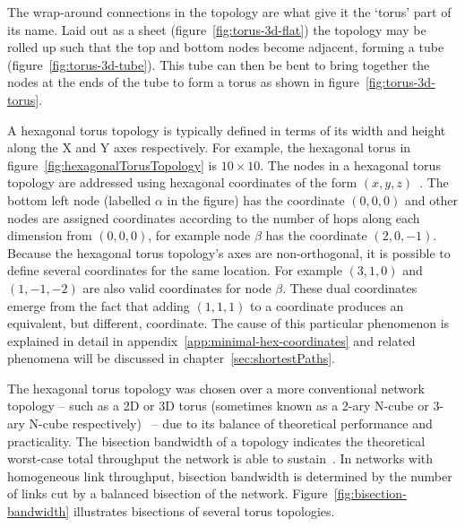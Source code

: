 		The wrap-around connections in the topology are what give it the `torus'
		part of its name. Laid out as a sheet (figure~\ref{fig:torus-3d-flat}) the
		topology may be rolled up such that the top and bottom nodes become
		adjacent, forming a tube (figure~\ref{fig:torus-3d-tube}). This tube can
		then be bent to bring together the nodes at the ends of the tube to form a
		torus as shown in figure~\ref{fig:torus-3d-torus}.
		
		A hexagonal torus topology is typically defined in terms of its width and
		height along the X and Y axes respectively. For example, the hexagonal
		torus in figure~\ref{fig:hexagonalTorusTopology} is $10\times10$.  The
		nodes in a hexagonal torus topology are addressed using hexagonal
		coordinates of the form $(x, y, z)$~\cite{patel15}. The bottom left node
		(labelled $\alpha$ in the figure) has the coordinate $(0, 0, 0)$ and other
		nodes are assigned coordinates according to the number of hops along each
		dimension from $(0, 0, 0)$, for example node $\beta$ has the coordinate
		$(2, 0, -1)$. Because the hexagonal torus topology's axes are
		non-orthogonal, it is possible to define several coordinates for the same
		location. For example $(3, 1, 0)$ and $(1, -1, -2)$ are also valid
		coordinates for node $\beta$. These dual coordinates emerge from the fact
		that adding $(1, 1, 1)$ to a coordinate produces an equivalent, but
		different, coordinate. The cause of this particular phenomenon is explained
		in detail in appendix~\ref{app:minimal-hex-coordinates} and related
		phenomena will be discussed in chapter~\ref{sec:shortestPaths}.
		
		The hexagonal torus topology was chosen over a more conventional network
		topology -- such as a 2D or 3D torus (sometimes known as a 2-ary N-cube or
		3-ary N-cube respectively)~\cite[chapters~3~and~5]{dally04} -- due to its
		balance of theoretical performance and practicality. The bisection
		bandwidth of a topology indicates the theoretical worst-case total
		throughput the network is able to sustain~\cite[chapter~1]{dally04}.  In
		networks with homogeneous link throughput, bisection bandwidth is
		determined by the number of links cut by a balanced bisection of the
		network.  Figure~\ref{fig:bisection-bandwidth} illustrates bisections of
		several torus topologies.
		
